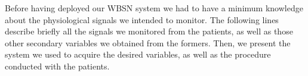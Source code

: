 
\label{chapter:setup}
Before having deployed our WBSN system we had to have a minimum knowledge about the physiological signals we intended to monitor. The following lines describe briefly all the signals we monitored from the patients, as well as those other secondary variables we obtained from the formers. Then, we present the system we used to acquire the desired variables, as well as the procedure conducted with the patients.